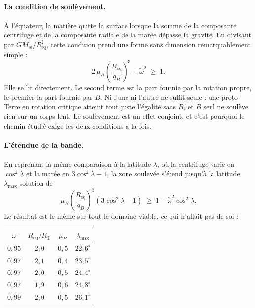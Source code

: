 \documentclass[11pt,a4paper,openany]{report}
\newcommand{\Mt}{M_{\oplus}}
\newcommand{\Rt}{R_{\oplus}}
\newcommand{\Req}{R_{\mathrm{eq}}}
\begin{document}
\paragraph{La condition de soulèvement.} À l'équateur, la matière quitte la surface lorsque la
somme de la composante centrifuge et de la composante radiale de la marée dépasse la gravité. En
divisant par $G\Mt/\Req^2$, cette condition prend une forme sans dimension remarquablement simple :
\begin{equation}
\boxed{\;2\,\mu_B\left(\frac{\Req}{q_B}\right)^{3}+\tilde\omega^{2}\;\ge\;1.\;}
\label{eq:soulevement}
\end{equation}
Elle se lit directement. Le second terme est la part fournie par la rotation propre, le premier la
part fournie par $B$. Ni l'une ni l'autre ne suffit seule : une proto-Terre en rotation critique
atteint tout juste l'égalité sans $B$, et $B$ seul ne soulève rien sur un corps lent. Le
soulèvement est un effet conjoint, et c'est pourquoi le chemin étudié exige les deux conditions à
la fois.

\paragraph{L'étendue de la bande.} En reprenant la même comparaison à la latitude $\lambda$, où la
centrifuge varie en $\cos^2\lambda$ et la marée en $3\cos^2\lambda-1$, la zone soulevée s'étend
jusqu'à la latitude $\lambda_{\max}$ solution de
\begin{equation}
\mu_B\left(\frac{\Req}{q_B}\right)^{3}\left(3\cos^{2}\lambda-1\right)
\;\ge\;1-\tilde\omega^{2}\cos^{2}\lambda .
\label{eq:bande}
\end{equation}
Le résultat est le même sur tout le domaine viable, ce qui n'allait pas de soi :

\begin{center}
\begin{tabular}{cccc}
\toprule
$\tilde\omega$ & $\Req/\Rt$ & $\mu_B$ & $\lambda_{\max}$ \\
\midrule
$0{,}95$ & $2{,}0$ & $0{,}5$ & $22{,}6^\circ$ \\
$0{,}97$ & $2{,}1$ & $0{,}4$ & $23{,}5^\circ$ \\
$0{,}97$ & $2{,}0$ & $0{,}5$ & $24{,}4^\circ$ \\
$0{,}97$ & $1{,}9$ & $0{,}6$ & $24{,}8^\circ$ \\
$0{,}99$ & $2{,}0$ & $0{,}5$ & $26{,}1^\circ$ \\
\bottomrule
\end{tabular}
\end{center}
\end{document}
